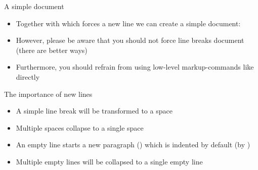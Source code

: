 
\begin{frame}{A simple document}
   \soldisablenumhl\begin{itemize}
      \item Together with \blatex{\\\\} which forces a new line we can create a simple document:
      \item However, please be aware that you should not force line breaks  document (there are better ways)
      \item Furthermore, you should refrain from using low-level markup-commands like \blatex{\\textbf} directly
   \end{itemize}
\end{frame}

\begin{frame}{The importance of new lines}
   \begin{itemize}
      \item A simple line break will be transformed to a space
      \item Multiple spaces collapse to a single space
      \item An empty line starts a new paragraph (\blatex{\\par}) which is indented by default (by \blatex{\\parindent})
      \item Multiple empty lines will be collapsed to a single empty line
   \end{itemize}
\end{frame}

